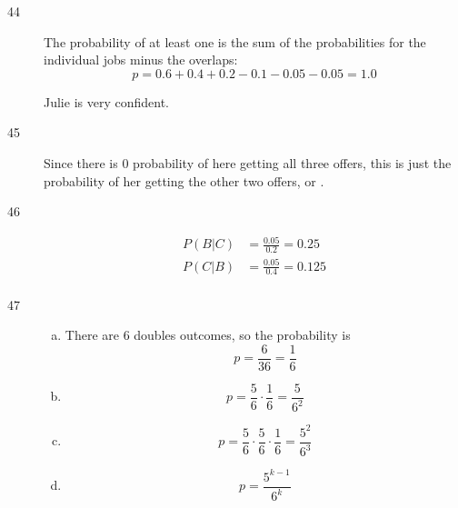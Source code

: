 \documentclass[letterpaper]{exam}
\begin{document}
\begin{description}


    \item[44]
      The probability of at least one is the sum of the probabilities for the individual
      jobs minus the overlaps:
        \[
          p = 0.6 + 0.4 + 0.2 - 0.1 - 0.05 - 0.05 = \boxed{ 1.0 }
        \]

        Julie is very confident.

    \item[45]
      Since there is 0 probability of here getting all three offers, this is just the
      probability of her getting the other two offers, or .

    \item[46]
      \begin{align*}
        P(B|C) &= \frac{0.05}{0.2} = \boxed{ 0.25 } \\
        P(C|B) &= \frac{0.05}{0.4} = \boxed{ 0.125 } \\
      \end{align*}

    \item[47]
      \begin{enumerate}[(a)]
        \item There are 6 doubles outcomes, so the probability is
          \[
            p = \frac{6}{36} = \boxed{ \frac{1}{6} }
          \]

        \item 
          \[
            p = \frac{5}{6} \cdot \frac{1}{6} = \boxed{ \frac{5}{6^2} }
          \]

        \item 
          \[
            p = \frac{5}{6} \cdot \frac{5}{6} \cdot \frac{1}{6} 
              = \boxed{ \frac{5^2}{6^3} }
          \]

        \item
          \[
            p = \frac{5^{k - 1}}{6^k}
          \]

      \end{enumerate}


\end{description}
\end{document}
